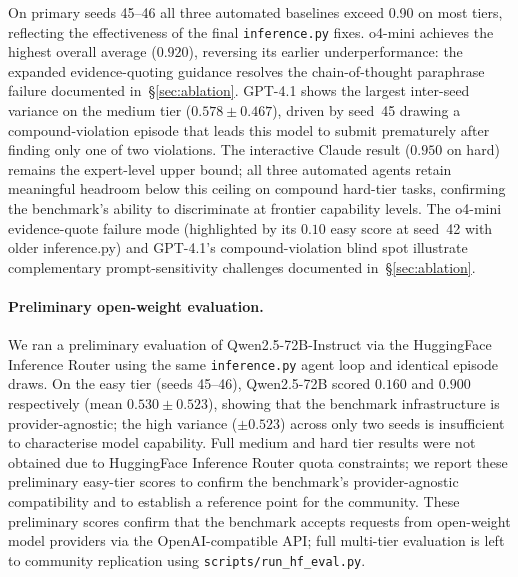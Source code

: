 \documentclass{article}
\begin{document}
On primary seeds 45--46 all three automated baselines exceed 0.90 on most tiers,
reflecting the effectiveness of the final \texttt{inference.py} fixes.
o4-mini achieves the highest overall average ($0.920$), reversing its earlier underperformance:
the expanded evidence-quoting guidance resolves the chain-of-thought paraphrase failure
documented in~\S\ref{sec:ablation}.
GPT-4.1 shows the largest inter-seed variance on the medium tier ($0.578\pm0.467$),
driven by seed~45 drawing a compound-violation episode that leads this model to submit
prematurely after finding only one of two violations.
The interactive Claude result ($0.950$ on hard) remains the expert-level upper bound;
all three automated agents retain meaningful headroom below this ceiling on compound
hard-tier tasks, confirming the benchmark's ability to discriminate at frontier capability levels.
The o4-mini evidence-quote failure mode (highlighted by its $0.10$ easy score at seed~42
with older inference.py) and GPT-4.1's compound-violation blind spot illustrate
complementary prompt-sensitivity challenges documented in~\S\ref{sec:ablation}.

\paragraph{Preliminary open-weight evaluation.}
We ran a preliminary evaluation of Qwen2.5-72B-Instruct via the HuggingFace Inference
Router using the same \texttt{inference.py} agent loop and identical episode draws.
On the easy tier (seeds 45--46), Qwen2.5-72B scored $0.160$ and $0.900$ respectively
(mean $0.530 \pm 0.523$), showing that the benchmark infrastructure is provider-agnostic; the high variance ($\pm0.523$) across only two seeds is insufficient to characterise model capability.
Full medium and hard tier results were not obtained due to HuggingFace Inference Router
quota constraints; we report these preliminary easy-tier scores to confirm the
benchmark's provider-agnostic compatibility and to establish a reference point for
the community.  These preliminary scores confirm that the benchmark accepts requests from open-weight model providers via the OpenAI-compatible API; full multi-tier evaluation is left to community replication using \texttt{scripts/run\_hf\_eval.py}.
\end{document}
